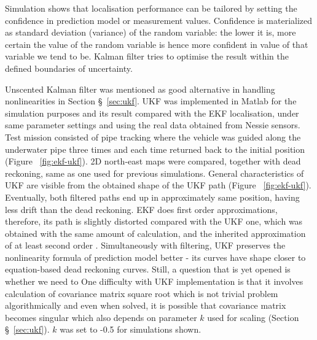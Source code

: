 Simulation shows that localisation performance can be tailored by setting the confidence in prediction model or measurement values. Confidence is materialized as standard deviation (variance) of the random variable: the lower it is, more certain the value of the random variable is hence more confident in value of that variable we tend to be. Kalman filter tries to optimise the result within the defined boundaries of uncertainty. 

Unscented Kalman filter was mentioned as good alternative in handling nonlinearities in Section \S~\ref{sec:ukf}. UKF was implemented in Matlab for the simulation purposes and its result compared with the EKF localisation, under same parameter settings and using the real data obtained from Nessie sensors. Test mission consisted of pipe tracking where the vehicle was guided along the underwater pipe three times and each time returned back to the initial position (Figure ~\ref{fig:ekf-ukf}). 2D north-east maps were compared, together with dead reckoning, same as one used for previous simulations. General characteristics of UKF are visible from the obtained shape of the UKF path (Figure ~\ref{fig:ekf-ukf}). Eventually, both filtered paths end up in approximately same position, having less drift than the dead reckoning. EKF does first order approximations, therefore, its path is slightly distorted compared with the UKF one, which was obtained with the same amount of calculation, and the inherited approximation of at least second order \cite{julier96}. Simultaneously with filtering, UKF preserves the nonlinearity formula of prediction model better - its curves have shape closer to equation-based dead reckoning curves. Still, a question that is yet opened is whether we need to  One difficulty with UKF implementation is that it involves calculation of covariance matrix square root which is not trivial problem algorithmically and even when solved, it is possible that covariance matrix becomes singular which also depends on parameter $k$ used for scaling (Section \S~\ref{sec:ukf}). $k$ was set to -0.5 for simulations shown.        
